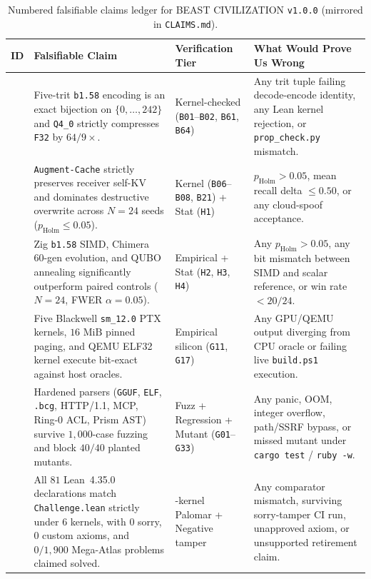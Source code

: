 \documentclass[11pt,letterpaper]{amsart}
\newcommand{\code}[1]{{\small\texttt{#1}}}
\begin{document}
\begin{table}[t]
\centering
\caption{Numbered falsifiable claims ledger for \textsc{BEAST CIVILIZATION} \code{v1.0.0} (mirrored in \code{CLAIMS.md}).}
\label{tab:claims}
\scriptsize
\begin{tabular}{@{} >{\raggedright\arraybackslash}p{0.65cm} >{\raggedright\arraybackslash}p{4.8cm} >{\raggedright\arraybackslash}p{2.3cm} >{\raggedright\arraybackslash}p{5.5cm} @{}}
\toprule
\textbf{ID} & \textbf{Falsifiable Claim} & \textbf{Verification Tier} & \textbf{What Would Prove Us Wrong} \\
\midrule
\code{C1} & Five-trit \code{b1.58} encoding is an exact bijection on $\{0,\dots,242\}$ and \code{Q4\_0} strictly compresses \code{F32} by $64/9\times$. & Kernel-checked (\code{B01}--\code{B02}, \code{B61}, \code{B64}) & Any trit tuple failing decode-encode identity, any Lean kernel rejection, or \code{prop\_check.py} mismatch. \\
\code{C2} & \code{Augment-Cache} strictly preserves receiver self-KV and dominates destructive overwrite across $N=24$ seeds ($p_{\mathrm{Holm}} \le 0.05$). & Kernel (\code{B06}--\code{B08}, \code{B21}) + Stat (\code{H1}) & $p_{\mathrm{Holm}} > 0.05$, mean recall delta $\le 0.50$, or any cloud-spoof acceptance. \\
\code{C3} & Zig \code{b1.58} SIMD, Chimera 60-gen evolution, and QUBO annealing significantly outperform paired controls ($N=24$, FWER $\alpha=0.05$). & Empirical + Stat (\code{H2}, \code{H3}, \code{H4}) & Any $p_{\mathrm{Holm}} > 0.05$, any bit mismatch between SIMD and scalar reference, or win rate $< 20/24$. \\
\code{C4} & Five Blackwell \code{sm\_12.0} PTX kernels, $16\text{ MiB}$ pinned paging, and QEMU ELF32 kernel execute bit-exact against host oracles. & Empirical silicon (\code{G11}, \code{G17}) & Any GPU/QEMU output diverging from CPU oracle or failing live \code{build.ps1} execution. \\
\code{C5} & Hardened parsers (\code{GGUF}, \code{ELF}, \code{.bcg}, HTTP/1.1, MCP, Ring-0 ACL, Prism AST) survive $1{,}000$-case fuzzing and block $40/40$ planted mutants. & Fuzz + Regression + Mutant (\code{G01}--\code{G33}) & Any panic, OOM, integer overflow, path/SSRF bypass, or missed mutant under \code{cargo test} / \code{ruby -w}. \\
\code{C6} & All $81$ Lean~4.35.0 declarations match \code{Challenge.lean} strictly under 6 kernels, with $0$ sorry, $0$ custom axioms, and $0/1{,}900$ Mega-Atlas problems claimed solved. & 6-kernel Palomar + Negative tamper & Any comparator mismatch, surviving sorry-tamper CI run, unapproved axiom, or unsupported retirement claim. \\
\bottomrule
\end{tabular}
\end{table}
\end{document}
